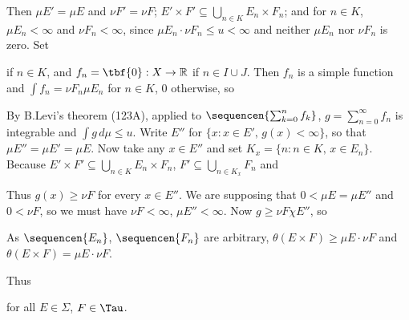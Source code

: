 {\noindent Then $\mu E'=\mu E$ and $\nu F'=\nu F$;
$E'\times F'\subseteq\bigcup_{n\in K}E_n\times F_n$;  and for $n\in K$,
$\mu E_n<\infty$ and $\nu F_n<\infty$, since
$\mu E_n\cdot\nu F_n\le u<\infty$ and
neither $\mu E_n$ nor $\nu F_n$ is zero.   Set


\noindent if $n\in K$, and $f_n=\tbf{0}:X\to\Bbb R$ if $n\in I\cup J$.
Then $f_n$ is a simple function and
$\int f_n=\nu F_n\mu E_n$ for $n\in K$, $0$ otherwise, so


\noindent By B.Levi's theorem (123A), applied to
$\sequencen{\sum_{k=0}^nf_k}$,
$g=\sum_{n=0}^{\infty}f_n$ is integrable and $\int g\,d\mu\le u$.
Write $E''$  for $\{x:x\in E',\,g(x)<\infty\}$, so that
$\mu E''=\mu E'=\mu E$.   Now take any $x\in E''$ and set
$K_x=\{n:n\in K,\,x\in E_n\}$.   Because
$E'\times F'\subseteq\bigcup_{n\in K}E_n\times F_n$,
$F'\subseteq\bigcup_{n\in K_x}F_n$ and


\noindent Thus $g(x)\ge\nu F$ for every $x\in E''$.   We are
supposing that $0<\mu E=\mu E''$ and $0<\nu F$, so we must have
$\nu F<\infty$, $\mu E''<\infty$.   Now  $g\ge\nu F\chi E''$,  so


\noindent As $\sequencen{E_n}$, $\sequencen{F_n}$ are arbitrary,
$\theta(E\times F)\ge\mu E\cdot\nu F$ and
$\theta(E\times F)=\mu E\cdot\nu F$.\ \Qed

Thus


\noindent for all $E\in\Sigma$, $F\in\Tau$.
}%



